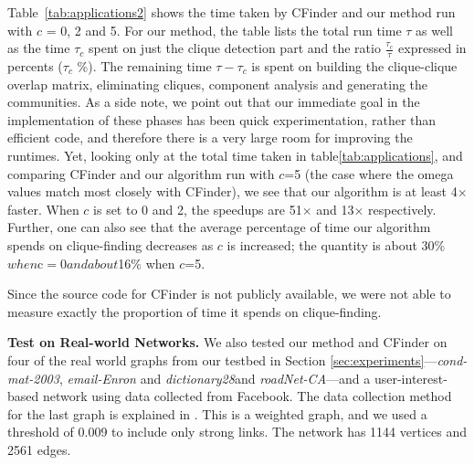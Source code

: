 Table~\ref{tab:applications2} shows the time taken by CFinder and our method 
run with $c$ = 0, 2 and 5. For our method, the table lists the total run time $\tau$ 
as well as the time $\tau_c$ spent on just the clique detection part and the ratio
$\frac{\tau_c}{\tau}$ expressed in percents ($\tau_c$ \%).
The remaining time $\tau - \tau_c$ is spent on building the clique-clique overlap matrix, eliminating cliques, component analysis and generating the communities.  As a side note,
we point out that our immediate goal in the implementation of these phases has been quick experimentation, rather than efficient code, and therefore there is a very large room for improving the runtimes. Yet, looking only at the total time taken in table\ref{tab:applications}, and comparing CFinder and our algorithm run with $c$=5 (the case where the omega values match most closely with CFinder), we see that our algorithm is at least 4$\times$ faster. When $c$ is set to 0 and 2, the speedups are 51$\times$ and 13$\times$ respectively. Further, one can also see that the average percentage of time our algorithm spends on clique-finding decreases as $c$ is increased; the quantity is about $30$\%$ when $c$=0 and about 
$16$\%$ when $c$=5.

Since the source code for CFinder is not publicly available, we were not able to measure exactly the proportion of time it spends on clique-finding. 


{\bf Test on Real-world Networks. } We also tested our method and CFinder on four of the real world graphs from our testbed in Section \ref{sec:experiments}---{\em cond-mat-2003}, {\em email-Enron} and {\em dictionary28}and {\em roadNet-CA}---and a user-interest-based network using data collected from  Facebook. The data collection method for the last graph is explained in \cite{dianapaper}. This is a weighted graph, and we used a threshold of 0.009 to include only strong links.
The network has 1144 vertices and 2561 edges. 


